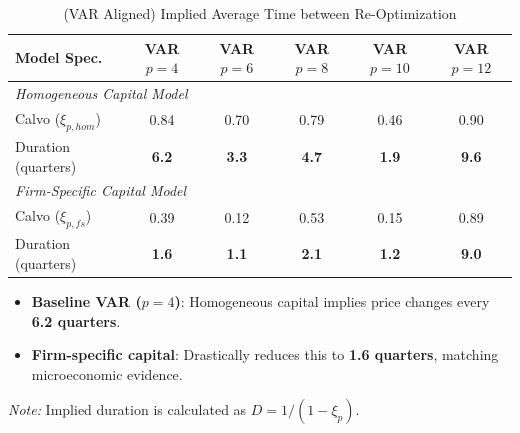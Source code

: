 \begin{table}[htpb]
    \centering
    \small
    \renewcommand{\arraystretch}{1.2}
    \caption{(VAR Aligned) Implied Average Time between Re-Optimization}
    \label{tab:implied_duration_all_lags}
    \begin{tabular}{lccccc}
        \toprule
        \textbf{Model Spec.} & \textbf{VAR $p=4$} & \textbf{VAR $p=6$} & \textbf{VAR $p=8$} & \textbf{VAR $p=10$} & \textbf{VAR $p=12$} \\
        \midrule

        \multicolumn{6}{l}{\textit{Homogeneous Capital Model}} \\
        Calvo ($\xi_{p, hom}$) & 0.84 & 0.70 & 0.79 & 0.46 & 0.90 \\
        Duration (quarters)     & \textbf{6.2} & \textbf{3.3} & \textbf{4.7} & \textbf{1.9} & \textbf{9.6} \\

        \midrule
        \multicolumn{6}{l}{\textit{Firm-Specific Capital Model}} \\
        Calvo ($\xi_{p, fs}$) & 0.39 & 0.12 & 0.53 & 0.15 & 0.89 \\
        Duration (quarters)    & \textbf{1.6} & \textbf{1.1} & \textbf{2.1} & \textbf{1.2} & \textbf{9.0} \\

        \bottomrule
    \end{tabular}

    \vspace{0.2cm}
    \begin{itemize}
        \item \textbf{Baseline VAR ($p=4$)}: Homogeneous capital implies price changes every \textbf{6.2 quarters}.
        \item \textbf{Firm-specific capital}: Drastically reduces this to \textbf{1.6 quarters}, matching microeconomic evidence.
    \end{itemize}

    \vspace{0.2cm}
    \raggedright
    \scriptsize{\textit{Note:} Implied duration is calculated as $D = 1/(1 - \xi_p)$.}
\end{table}
